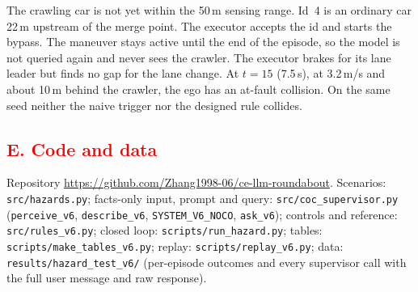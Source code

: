 \documentclass[11pt]{article}
\newcommand{\rev}[1]{\textcolor{red}{#1}}
\newenvironment{revblock}{\color{red}}{}
\begin{document}
\begin{revblock}
\noindent The crawling car is not yet within the 50\,m sensing range. Id~4 is an ordinary car 22\,m upstream of the merge
point. The executor accepts the id and starts the bypass. The maneuver stays active until the end of the episode, so the
model is not queried again and never sees the crawler. The executor brakes for its lane leader but finds no gap for the
lane change. At $t=15$ (7.5\,s), at 3.2\,m/s and about 10\,m behind the crawler, the ego has an at-fault collision. On the
same seed neither the naive trigger nor the designed rule collides.
\end{revblock}

\subsection*{\rev{E. Code and data}}
\begin{revblock}
Repository \url{https://github.com/Zhang1998-06/ce-llm-roundabout}. Scenarios: \texttt{src/hazards.py}; facts-only input,
prompt and query: \texttt{src/coc\_supervisor.py} (\texttt{perceive\_v6}, \texttt{describe\_v6}, \texttt{SYSTEM\_V6\_NOCO},
\texttt{ask\_v6}); controls and reference: \texttt{src/rules\_v6.py}; closed loop: \texttt{scripts/run\_hazard.py};
tables: \texttt{scripts/make\_tables\_v6.py}; replay: \texttt{scripts/replay\_v6.py}; data: \texttt{results/hazard\_test\_v6/}
(per-episode outcomes and every supervisor call with the full user message and raw response).
\end{revblock}
\end{document}
